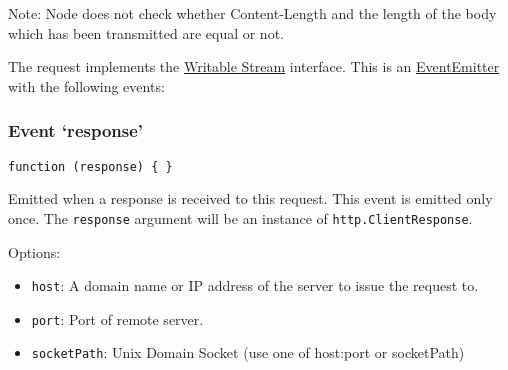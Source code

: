 \begin{Shaded}
\begin{Highlighting}[]
\NormalTok{(}\NormalTok{, } 
  \NormalTok{(}\NormalTok{, } 
    \NormalTok{(} 
  \NormalTok{\});}
\NormalTok{\});}

\NormalTok{(}\NormalTok{, } 
   \NormalTok{() \{}
    \NormalTok{(}\NormalTok{, } 
      \NormalTok{(} 
    \NormalTok{\});}
  \NormalTok{\}, }\NormalTok{);}
\NormalTok{\});}
\end{Highlighting}
\end{Shaded}

Note: Node does not check whether Content-Length and the length of the
body which has been transmitted are equal or not.

The request implements the
\href{stream.html\#stream\_writable\_stream}{Writable Stream} interface.
This is an
\href{events.html\#events\_class\_events\_eventemitter}{EventEmitter}
with the following events:

\subsubsection{Event `response'}

\texttt{function (response) \{ \}}

Emitted when a response is received to this request. This event is
emitted only once. The \texttt{response} argument will be an instance of
\texttt{http.ClientResponse}.

Options:

\begin{itemize}
\item
  \texttt{host}: A domain name or IP address of the server to issue the
  request to.
\item
  \texttt{port}: Port of remote server.
\item
  \texttt{socketPath}: Unix Domain Socket (use one of host:port or
  socketPath)
\end{itemize}

